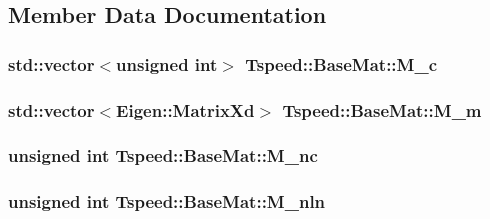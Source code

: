 \subsection{Member Data Documentation}
\hypertarget{classTspeed_1_1BaseMat_a0c1966f176c1bf095decc0f40fd2397f}{
\subsubsection[{M\-\_\-c}]{\setlength{\rightskip}{0pt plus 5cm}std\-::vector$<$unsigned int$>$ Tspeed\-::\-Base\-Mat\-::\-M\-\_\-c\hspace{0.3cm}{\ttfamily [protected]}}}\label{classTspeed_1_1BaseMat_a0c1966f176c1bf095decc0f40fd2397f}
\hypertarget{classTspeed_1_1BaseMat_a4020a63099be7634e355b66c21a37bc0}{
\subsubsection[{M\-\_\-m}]{\setlength{\rightskip}{0pt plus 5cm}std\-::vector$<$Eigen\-::\-Matrix\-Xd$>$ Tspeed\-::\-Base\-Mat\-::\-M\-\_\-m\hspace{0.3cm}{\ttfamily [protected]}}}\label{classTspeed_1_1BaseMat_a4020a63099be7634e355b66c21a37bc0}
\hypertarget{classTspeed_1_1BaseMat_aaeeb3b9b5163d2ad7213877c6d9d3a48}{
\subsubsection[{M\-\_\-nc}]{\setlength{\rightskip}{0pt plus 5cm}unsigned int Tspeed\-::\-Base\-Mat\-::\-M\-\_\-nc\hspace{0.3cm}{\ttfamily [protected]}}}\label{classTspeed_1_1BaseMat_aaeeb3b9b5163d2ad7213877c6d9d3a48}
\hypertarget{classTspeed_1_1BaseMat_a6a75298d3c989a182f972916f894df47}{
\subsubsection[{M\-\_\-nln}]{\setlength{\rightskip}{0pt plus 5cm}unsigned int Tspeed\-::\-Base\-Mat\-::\-M\-\_\-nln\hspace{0.3cm}{\ttfamily [protected]}}}\label{classTspeed_1_1BaseMat_a6a75298d3c989a182f972916f894df47}
